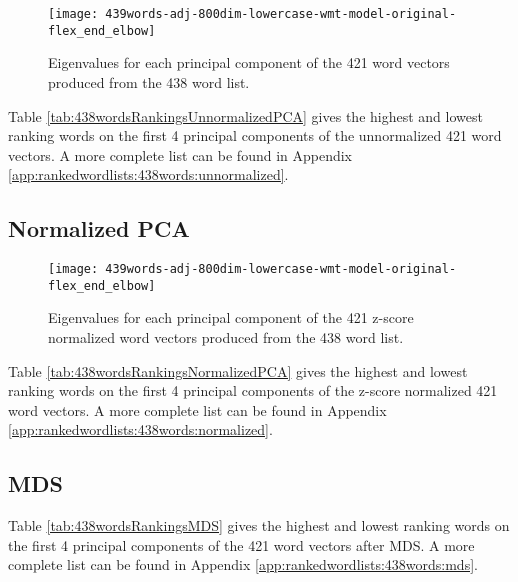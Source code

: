 \documentclass[eric_thesis.tex]{subfiles}
\begin{document}


\begin{figure}[!tbp]
    \texttt{[image: 439words-adj-800dim-lowercase-wmt-model-original-flex\_end\_elbow]}
    \caption{Eigenvalues for each principal component of the 421 word vectors
    produced from the 438 word list.}
    \label{fig:438wordsunnormalizedpcaeigenvalues}
\end{figure}

Table \ref{tab:438wordsRankingsUnnormalizedPCA} gives the highest and lowest
ranking words on the first 4 principal components of the unnormalized 421 word 
vectors. A more complete list can be found in Appendix 
\ref{app:rankedwordlists:438words:unnormalized}.


\subsection{Normalized PCA}



\begin{figure}[!tbp]
    \texttt{[image: 439words-adj-800dim-lowercase-wmt-model-original-flex\_end\_elbow]}
    \caption{Eigenvalues for each principal component of the 421 z-score 
    normalized word vectors produced from the 438 word list.}
    \label{fig:438wordsnormalizedpcaeigenvalues}
\end{figure}

Table \ref{tab:438wordsRankingsNormalizedPCA} gives the highest and lowest
ranking words on the first 4 principal components of the z-score normalized 421 
word vectors. A more complete list can be found in Appendix 
\ref{app:rankedwordlists:438words:normalized}.

\subsection{MDS}



Table \ref{tab:438wordsRankingsMDS} gives the highest and lowest
ranking words on the first 4 principal components of the 421 word 
vectors after MDS. A more complete list can be found in Appendix 
\ref{app:rankedwordlists:438words:mds}.
\end{document}
